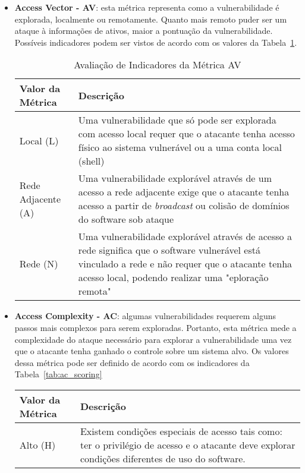 \begin{itemize}
\item \textbf{Access Vector - AV}: esta métrica representa como a vulnerabilidade é explorada, localmente ou remotamente. Quanto mais remoto puder ser um ataque à informações de ativos, maior a pontuação da vulnerabilidade. Possíveis indicadores podem ser vistos  de acordo com os valores da Tabela~\ref{tab:av_scoring}.
	\begin{table}[H]
	\begin{center}
	    \begin{tabular}{ | l | p{10cm} |}
	    \hline
	    Valor da Métrica & Descrição \\ \hline
	    Local (L) & Uma vulnerabilidade que só pode ser explorada com acesso local requer que o atacante tenha acesso físico ao sistema vulnerável ou a uma conta local (shell) \\ \hline
	    Rede Adjacente (A) & Uma vulnerabilidade explorável através de um acesso a rede adjacente exige que o atacante tenha acesso a partir de \emph{broadcast} ou colisão de domínios do software sob ataque \\ \hline
	    Rede (N) & Uma vulnerabilidade explorável através de acesso a rede significa que o software vulnerável está vinculado a rede e não requer que o atacante tenha acesso local, podendo realizar uma "eploração remota" \\ \hline
	    \end{tabular}
	    \caption{Avaliação de Indicadores da Métrica AV}
	    \label{tab:av_scoring}
	\end{center}
	\end{table}
\item \textbf{Access Complexity - AC}: algumas vulnerabilidades requerem alguns passos mais complexos para serem exploradas. Portanto, esta métrica mede a complexidade do ataque necessário para explorar a vulnerabilidade uma vez que o atacante tenha ganhado o controle sobre um sistema alvo. Os valores dessa métrica pode ser definido de acordo com os indicadores da Tabela~\ref{tab:ac_scoring}
	\begin{table}[H]
	\begin{center}
	    \begin{tabular}{ | l | p{10cm} |}
	    \hline
	    Valor da Métrica & Descrição \\ \hline
	    Alto (H) & Existem condições especiais de acesso tais como: ter o privilégio de acesso e o atacante deve explorar condições diferentes de uso do software. \\ \hline

\end{tabular}
\end{center}
\end{table}
\end{itemize}
